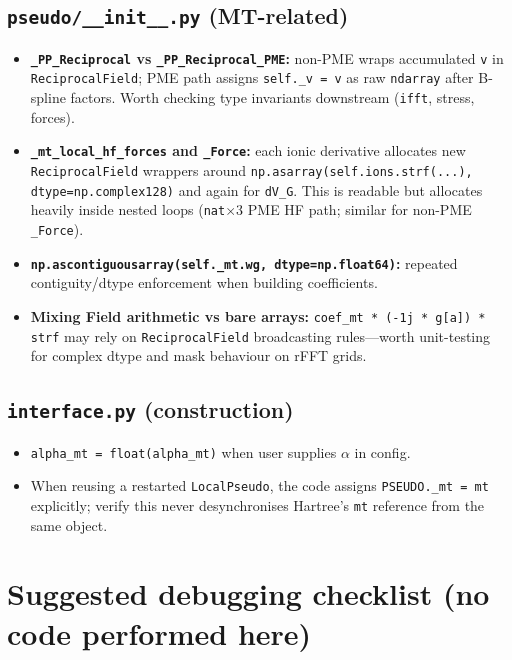 \documentclass[11pt,a4paper]{article}
\begin{document}
\subsection{\texttt{pseudo/\_\_init\_\_.py} (MT-related)}

\begin{itemize}
  \item \textbf{\texttt{\_PP\_Reciprocal} vs \texttt{\_PP\_Reciprocal\_PME}:} non-PME wraps
        accumulated \texttt{v} in \texttt{ReciprocalField}; PME path assigns
        \texttt{self.\_v = v} as raw \texttt{ndarray} after B-spline factors. Worth
        checking type invariants downstream (\texttt{ifft}, stress, forces).
  \item \textbf{\texttt{\_mt\_local\_hf\_forces} and \texttt{\_Force}:} each ionic
        derivative allocates new \texttt{ReciprocalField} wrappers around
        \texttt{np.asarray(self.ions.strf(...), dtype=np.complex128)} and again for
        \texttt{dV\_G}. This is readable but allocates heavily inside nested loops
        (\texttt{nat}$\times 3$ PME HF path; similar for non-PME \texttt{\_Force}).
  \item \textbf{\texttt{np.ascontiguousarray(self.\_mt.wg, dtype=np.float64)}:} repeated
        contiguity/dtype enforcement when building coefficients.
  \item \textbf{Mixing Field arithmetic vs bare arrays:} \texttt{coef\_mt * (-1j * g[a]) * strf}
        may rely on \texttt{ReciprocalField} broadcasting rules---worth unit-testing for
        complex dtype and mask behaviour on rFFT grids.
\end{itemize}

\subsection{\texttt{interface.py} (construction)}

\begin{itemize}
  \item \texttt{alpha\_mt = float(alpha\_mt)} when user supplies $\alpha$ in config.
  \item When reusing a restarted \texttt{LocalPseudo}, the code assigns
        \texttt{PSEUDO.\_mt = mt} explicitly; verify this never desynchronises Hartree's
        \texttt{mt} reference from the same object.
\end{itemize}

\section{Suggested debugging checklist (no code performed here)}
\end{document}
